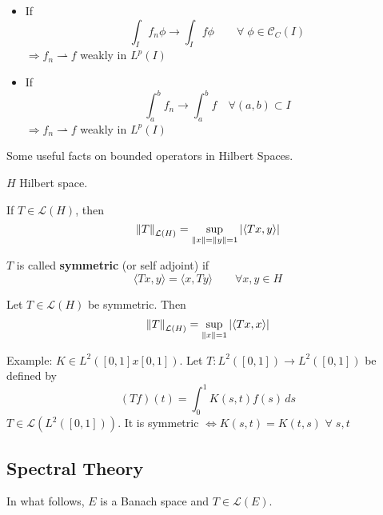 \begin{itemize}
    \item If 
    \[
        \int_I f_n \phi \to \int_I f \phi \qquad \forall \; \phi \in \mathcal{C}_C(I)
    \]
    \(\Rightarrow f_n \rightharpoonup f\) weakly in \(L^p(I)\)
    \item If 
    \[
        \int_a^b f_n \to \int_a^b f \quad \forall (a, b) \subset I
    \]
    \(\Rightarrow f_n \rightharpoonup f\) weakly in \(L^p(I)\)
\end{itemize}

Some useful facts on bounded operators in Hilbert Spaces.

\(H\) Hilbert space. 
\begin{proposition}
    If \(T \in \mathcal{L}(H)\), then
    \[
        \norm{T}_{\mathcal{L}(H)} = \sup_{\norm{x}=\norm{y}=1} \abs{\langle Tx, y\rangle  }
    \]
\end{proposition}
\begin{definition}
    \(T \) is called \textbf{symmetric} (or self adjoint) if 
    \[
        \langle Tx, y\rangle   = \langle x, Ty\rangle   \qquad \forall x, y \in H
    \]
\end{definition}
\begin{proposition}
    Let \(T \in \mathcal{L}(H)\) be symmetric. Then 
    \[
        \norm{T}_{\mathcal{L}(H)} = \sup_{\norm{x}= 1} \abs{\langle Tx, x\rangle  }
    \]
\end{proposition}

Example: \(K \in L^2([0, 1]x[0, 1])\). Let \(T: L^2([0, 1]) \to L^2([0, 1])\) be defined by 
\[
    (Tf)(t) = \int_0^1 K(s, t) f(s) \,ds
\]
\(T \in \mathcal{L}(L^2([0, 1]))\). It is symmetric \(\iff K(s, t) = K(t, s)\) \(\forall \; s, t\)

\subsection*{Spectral Theory}
In what follows, \(E\) is a Banach space and \(T \in \mathcal{L}(E)\).

